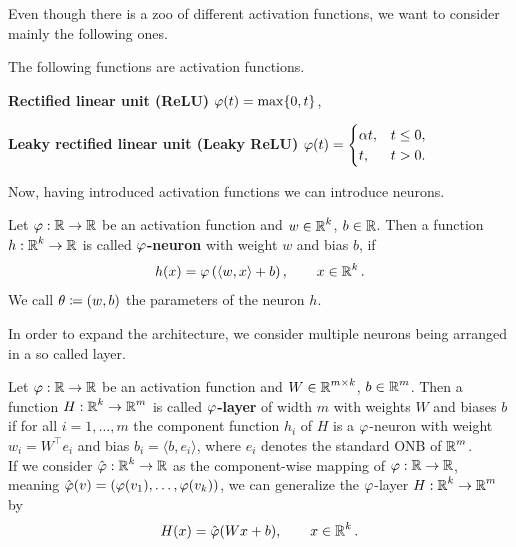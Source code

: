 Even though there is a zoo of different activation functions, we want to consider mainly the following ones.

\begin{example}
The following functions are activation functions.
\begin{mydescription}{}
\item[\textbf{Rectified linear unit (ReLU)}] $\operatorname{\varphi}(t) = \max\{0, t\}$,
\item[\textbf{Leaky rectified linear unit (Leaky ReLU)}] $\displaystyle \operatorname{\varphi}(t) = \begin{cases}
\alpha t, 	& t \leq 0,\\
t,		& t > 0.
\end{cases}$
\end{mydescription}
\end{example}

Now, having introduced activation functions we can introduce neurons.

\begin{definition}
Let $\operatorname{\varphi}: \operatorname{\mathbb{R}} \to \operatorname{\mathbb{R}}$ be an activation function and $w\in \operatorname{\mathbb{R}}^k$, $b \in \operatorname{\mathbb{R}}$. Then a function $h: \operatorname{\mathbb{R}}^k \to \operatorname{\mathbb{R}}$ is called \textbf{$\operatorname{\varphi}$-neuron} with weight $w$ and bias $b$, if
\begin{align}\label{def_neuron}
h(x) = \operatorname{\varphi} \left(\langle w, x \rangle + b \right), \qquad x \in \operatorname{\mathbb{R}}^k.
\end{align}
We call $\theta \coloneqq (w, b)$ the parameters of the neuron $h$.
\end{definition}

In order to expand the architecture, we consider multiple neurons being arranged in a so called layer.

\begin{definition}\label{def_layer}
Let $\operatorname{\varphi}: \operatorname{\mathbb{R}} \to \operatorname{\mathbb{R}}$ be an activation function and $W \in \operatorname{\mathbb{R}}^{m\times k}$, $b\in \operatorname{\mathbb{R}}^m$. Then a function $H:\operatorname{\mathbb{R}}^k \to \operatorname{\mathbb{R}}^m$ is called \textbf{$\operatorname{\varphi}$-layer} of width $m$ with weights $W$ and biases $b$ if for all $i=1,\ldots,m$ the component function $h_i$ of $H$ is a $\operatorname{\varphi}$-neuron with weight $w_i = W^\top e_i$ and bias $b_i = \langle b, e_i \rangle$, where $e_i$ denotes the standard ONB of $\operatorname{\mathbb{R}}^m$.\\
If we consider $\hat{\operatorname{\varphi}}: \operatorname{\mathbb{R}}^k \to \operatorname{\mathbb{R}}$ as the component-wise mapping of $\operatorname{\varphi}:\operatorname{\mathbb{R}}\to \operatorname{\mathbb{R}}$, meaning $\hat{\operatorname{\varphi}}(v) = (\operatorname{\varphi}(v_1), \ldots, \operatorname{\varphi}(v_k))$, we can generalize the $\operatorname{\varphi}$-layer $H:\operatorname{\mathbb{R}}^k \to \operatorname{\mathbb{R}}^m$ by
\begin{align}
H(x) = \hat{\operatorname{\varphi}}(Wx + b), \qquad x \in \operatorname{\mathbb{R}} ^k.
\end{align}
\end{definition}

